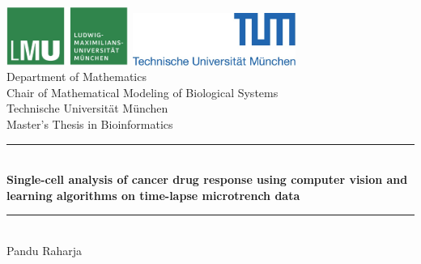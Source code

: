 \documentclass[pdftex,12pt,a4paper]{report}
\newcommand{\HRule}{\rule{\linewidth}{0.5mm}}
\begin{document}
\begin{titlepage}


\sffamily

\begin{center}


\includegraphics[width=0.3\textwidth]{logo2.jpg}
\hfill
\includegraphics[width=0.4\textwidth]{logo1.jpg}  
\\[5cm]

{\Large Department of Mathematics}\\[0.5cm]
{\Large Chair of Mathematical Modeling of Biological Systems}\\[0.5cm]
{Technische Universit\"at M\"unchen}\\[2cm]
{\Large Master's Thesis in Bioinformatics}\\[1.5cm]

\HRule \\[0.4cm]
{ \huge \bfseries Single-cell analysis of cancer drug response using computer vision and learning algorithms on time-lapse microtrench data}\\[0.4cm]

\HRule \\[1.5cm]

{\Large Pandu Raharja}\\[2.5cm]

\vfill
\end{center}
\end{titlepage}
\pagestyle{empty}
\end{document}
